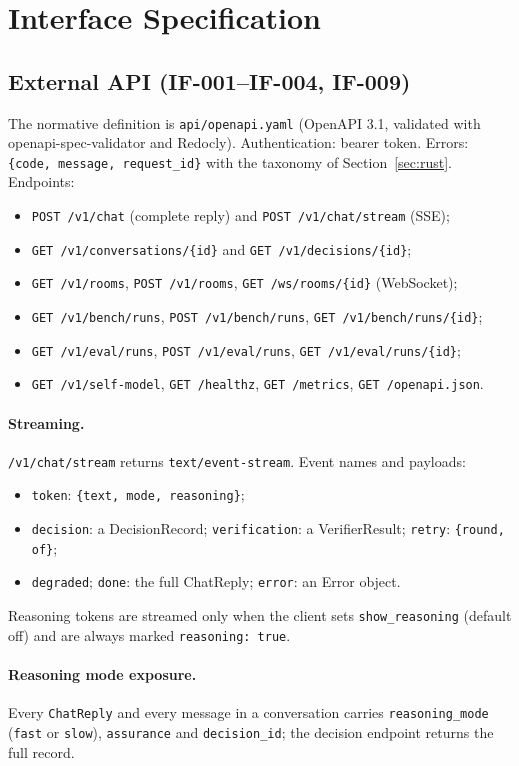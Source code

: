 \documentclass[11pt,a4paper]{article}
\begin{document}
\section{Interface Specification}
\label{sec:interfaces}
\subsection{External API (IF-001--IF-004, IF-009)}
The normative definition is \texttt{api/openapi.yaml} (OpenAPI 3.1, validated with openapi-spec-validator and Redocly). Authentication: bearer token. Errors: \texttt{\{code, message, request\_id\}} with the taxonomy of Section~\ref{sec:rust}. Endpoints:
\begin{itemize}
\item \texttt{POST /v1/chat} (complete reply) and \texttt{POST /v1/chat/stream} (SSE);
\item \texttt{GET /v1/conversations/\{id\}} and \texttt{GET /v1/decisions/\{id\}};
\item \texttt{GET /v1/rooms}, \texttt{POST /v1/rooms}, \texttt{GET /ws/rooms/\{id\}} (WebSocket);
\item \texttt{GET /v1/bench/runs}, \texttt{POST /v1/bench/runs}, \texttt{GET /v1/bench/runs/\{id\}};
\item \texttt{GET /v1/eval/runs}, \texttt{POST /v1/eval/runs}, \texttt{GET /v1/eval/runs/\{id\}};
\item \texttt{GET /v1/self-model}, \texttt{GET /healthz}, \texttt{GET /metrics}, \texttt{GET /openapi.json}.
\end{itemize}
\paragraph{Streaming.} \texttt{/v1/chat/stream} returns \texttt{text/event-stream}. Event names and payloads:
\begin{itemize}
\item \texttt{token}: \texttt{\{text, mode, reasoning\}};
\item \texttt{decision}: a DecisionRecord; \texttt{verification}: a VerifierResult; \texttt{retry}: \texttt{\{round, of\}};
\item \texttt{degraded}; \texttt{done}: the full ChatReply; \texttt{error}: an Error object.
\end{itemize}
Reasoning tokens are streamed only when the client sets \texttt{show\_reasoning} (default off) and are always marked \texttt{reasoning: true}.
\paragraph{Reasoning mode exposure.} Every \texttt{ChatReply} and every message in a conversation carries \texttt{reasoning\_mode} (\texttt{fast} or \texttt{slow}), \texttt{assurance} and \texttt{decision\_id}; the decision endpoint returns the full record.
\end{document}
